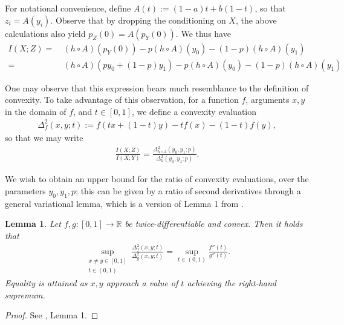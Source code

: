 \documentclass[12pt,reqno]{amsart}
\theoremstyle{plain} %
\newtheorem{lemma}[theorem]{Lemma}
\theoremstyle{remark}
\theoremstyle{definition}
\newcommand{\R}{\mathbb R}
\begin{document}
For notational convenience, define $A(t):=(1-a)t+b(1-t)$, so that $z_i=A(y_i)$. Observe that by dropping the conditioning on $X$, the above calculations also yield $p_Z(0)=A(p_Y(0))$. We thus have
\begin{align}
    I(X;Z)=&\ (h\circ A)(p_Y(0))-p(h\circ A)(y_0)-(1-p)(h\circ A)(y_1)\\
    =&\ (h\circ A)(py_0+(1-p)y_1)-p(h\circ A)(y_0)-(1-p)(h\circ A)(y_1)
\end{align}

One may observe that this expression bears much resemblance to the definition of convexity. To take advantage of this observation, for a function $f$, arguments $x,y$ in the domain of $f$, and $t\in[0,1]$, we define a convexity evaluation
\begin{align}
    \Delta^2_{f}(x,y;t):=f(tx+(1-t)y)-tf(x)-(1-t)f(y),
\end{align}
so that we may write
\begin{align}\label{eqn: mutual}
    \frac{I(X;Z)}{I(X;Y)}=\frac{\Delta^2_{h\circ A}(y_0,y_1;p)}{\Delta^2_h(y_0,y_1;p)}.
\end{align}

We wish to obtain an upper bound for the ratio of convexity evaluations, over the parameters $y_0, y_1, p$; this can be given by a ratio of second derivatives through a general variational lemma, which is a version of Lemma 1 from \cite{ES}.
\begin{lemma}\label{lem: ratiosup}
    Let $f,g:[0,1]\to\R$ be twice-differentiable and convex. Then it holds that
    \begin{align}
        \sup_{\substack{x\ne y\in[0,1] \\ t\in(0,1)}}\frac{\Delta^2_f(x,y;t)}{\Delta^2_g(x,y;t)}=\sup_{t\in(0,1)}\frac{f''(t)}{g''(t)}.
    \end{align}
    Equality is attained as $x,y$ approach a value of $t$ achieving the right-hand supremum.
\end{lemma}
\begin{proof}
    See \cite{ES}, Lemma 1. 
\end{proof}
\end{document}
